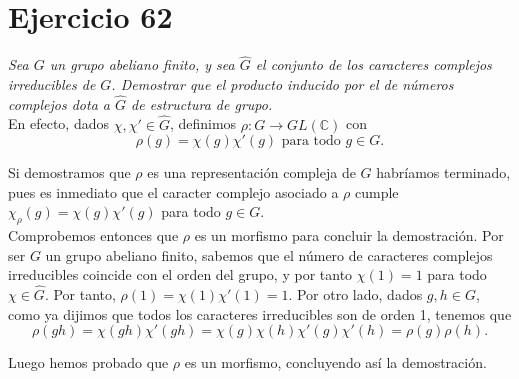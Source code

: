 \section{Ejercicio 62}%
\label{sec:ejercicio_62}

\textit{Sea \(G\) un grupo abeliano finito, y sea \(\widehat{G}\) el conjunto de los caracteres complejos irreducibles de \(G\). Demostrar que el producto inducido por el de números complejos dota a \(\widehat{G}\) de estructura de grupo.} \\

En efecto, dados \(\chi, \chi' \in \widehat{G}\), definimos \(\rho: G \to GL(\mathbb{C})\) con
\[
\rho(g) = \chi(g) \chi'(g) \text{ para todo } g \in G
.\]

Si demostramos que \(\rho\) es una representación compleja de \(G\) habríamos terminado, pues es inmediato que el caracter complejo asociado a \(\rho\) cumple \(\chi_{\rho}(g) = \chi(g) \chi'(g)\) para todo \(g \in G\). \\

Comprobemos entonces que \(\rho\) es un morfismo para concluir la demostración. Por ser \(G\) un grupo abeliano finito, sabemos que el número de caracteres complejos irreducibles coincide con el orden del grupo, y por tanto \(\chi(1) = 1\) para todo  \(\chi \in \widehat{G}\). Por tanto, \(\rho(1) = \chi(1)\chi'(1) = 1\). Por otro lado, dados \(g, h \in G\), como ya dijimos que todos los caracteres irreducibles son de orden 1, tenemos que
\[
\rho(gh) = \chi(gh) \chi'(gh) = \chi(g)\chi(h)\chi'(g)\chi'(h) = \rho(g)\rho(h)
.\]

Luego hemos probado que \(\rho\) es un morfismo, concluyendo así la demostración.

